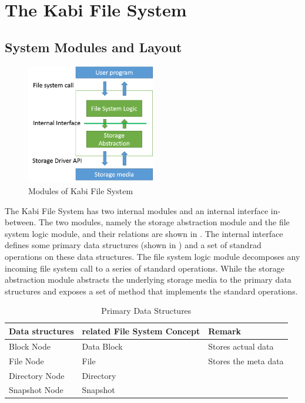 \chapter{The Kabi File System}
\label{chap:fs}

\section{System Modules and Layout}

\begin{figure}[hbtp]
\centering
\includegraphics[width=0.5\textwidth]{Chapter-3/figs/fig8.png}
\caption{Modules of Kabi File System}
\label{fig:modules}
\end{figure}

    The Kabi File System has two internal modules and an internal interface in-between. The two modules, namely the storage abstraction module and the file system logic module, and their relations are shown in . The internal interface defines some primary data structures (shown in ) and a set of standrad operations on these data structures. The file system logic module decomposes any incoming file system call to a series of standard operations. While the storage abstraction module abstracts the underlying storage media to the primary data structures and exposes a set of method that implements the standard operations.

\begin{table}
\caption{Primary Data Structures}
\label{tab:data_struct}
\begin{center}
\begin{tabular}{lll}
\toprule
Data structures & related File System Concept & Remark\\
\midrule
Block Node & Data Block & Stores actual data\\
File Node & File & Stores the meta data\\
Directory Node & Directory & \\
Snapshot Node & Snapshot & \\
\bottomrule
\end{tabular}
\end{center}
\end{table}


